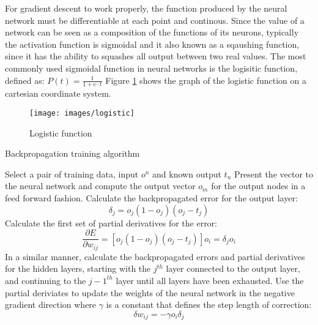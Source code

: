 
For gradient descent to work properly, the function produced by the neural network must be
differentiable at each point and continous. 
Since the value of a network can be seen as a composition of the
functions of its neurons, typically the activation function is sigmoidal and it also known as a sqaushing function, since it has the ability to squashes all output between two real values\cite{mitchell1997}.
The most commonly used sigmoidal function in neural networks is the logisitic function, defined as:
$P(t) = \frac{1}{1 + e^-t}$
Figure \ref{logistic} shows the graph of the logistic function on a cartesian coordinate system.

\begin{figure}[h!]
  \centering
  \texttt{[image: images/logistic]}
  \caption{Logistic function}
  \label{logistic}
\end{figure}

\begin{algorithm}[h!]
\caption{Backpropagation training algorithm}
\label{backpropAlg}    
\begin{algorithmic}

\STATE Select a pair of training data, input $o^n$ and known output $t_n$
\STATE Present the vector to the neural network and compute the
output vector $o_m$ for the output nodes in a feed forward fashion.
\STATE Calculate the backpropagated error for the output layer: 
\begin{displaymath}
\delta_j = o_j(1 - o_j)(o_j -t_j) 
\end{displaymath} 
\STATE Calculate the first set of partial derivatives for the error:
\begin{displaymath}
\frac{\partial E}{\partial w_{ij}} = [o_j(1 - o_j)(o_j - t_j)]o_i =
\delta_j o_i
\end{displaymath} 
\STATE In a similar manner, calculate the backpropagated errors and
partial derivatives for the
hidden layers, starting with the $j^{th}$ layer connected to the
output layer, and continuing to the $j-1^{th}$ layer until all layers
have been exhausted.
\STATE Use the partial deriviates to update the weights of the
neural network in the negative gradient direction where $\gamma$ is a
constant that defines the step length of correction:
\begin{displaymath}
\delta w_{ij} = - \gamma o_i \delta_j
\end{displaymath}
\ENDWHILE
\end{algorithmic}
\end{algorithm}

